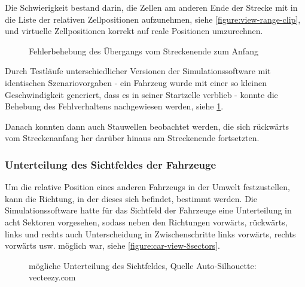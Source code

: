 Die Schwierigkeit bestand darin, die Zellen am anderen Ende der Strecke mit in die Liste der relativen Zellpositionen aufzunehmen, siehe \cref{figure:view-range-clip}, und virtuelle Zellpositionen korrekt auf reale Positionen umzurechnen.

\begin{figure}[hptb]
  \centering
     \qquad 
  \caption[Fehlerbehebung: Übergang vom Streckenende zum Anfang]
          {Fehlerbehebung des Übergangs vom Streckenende zum Anfang}
  \label{figure:go-negative}
\end{figure}

Durch Testläufe unterschiedlicher Versionen der Simulationssoftware mit identischen Szenariovorgaben - ein Fahrzeug wurde mit einer so kleinen Geschwindigkeit generiert, dass es in seiner Startzelle verblieb - konnte die Behebung des Fehlverhaltens nachgewiesen werden, siehe \cref{figure:go-negative}.

Danach konnten dann auch Stauwellen beobachtet werden, die sich rückwärts vom Streckenanfang her darüber hinaus am Streckenende fortsetzten. 



\subsubsection{Unterteilung des Sichtfeldes der Fahrzeuge}
\label{sec:unterteilung-sichtfeld}

Um die relative Position eines anderen Fahrzeugs in der Umwelt festzustellen, kann die Richtung, in der dieses sich befindet, bestimmt werden.
Die Simulationssoftware hatte für das Sichtfeld der Fahrzeuge eine Unterteilung in acht Sektoren vorgesehen, sodass neben den Richtungen vorwärts, rückwärts, links und rechts auch Unterscheidung in Zwischenschritte links vorwärts, rechts vorwärts usw. möglich war, siehe \cref{figure:car-view-8sectors}.

\begin{figure}[hptb]
  \centering 
   \qquad 
   \qquad 
  \caption[mögliche Unterteilung des Sichtfeldes]
          {mögliche Unterteilung des Sichtfeldes, Quelle Auto-Silhouette: vecteezy.com} 
  \label{figure:car-view-sectors}
\end{figure}

